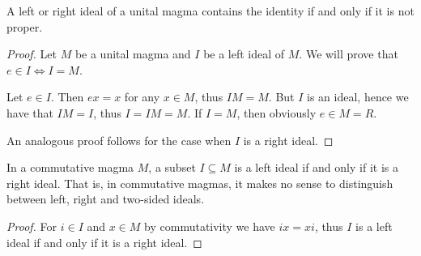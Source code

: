 \begin{proposition}\label{thm:proper_ideals_containing_identity}
  A left or right ideal of a unital magma contains the identity if and only if it is not proper.
\end{proposition}
\begin{proof}
  Let \( M \) be a unital magma and \( I \) be a left ideal of \( M \). We will prove that \( e \in I \iff I = M \).

  \begin{description}
    \Implies Let \( e \in I \). Then \( ex = x \) for any \( x \in M \), thus \( IM = M \). But \( I \) is an ideal, hence we have that \( IM = I \), thus \( I = IM = M \).
    \ImpliedBy If \( I = M \), then obviously \( e \in M = R \).
  \end{description}

  An analogous proof follows for the case when \( I \) is a right ideal.
\end{proof}

\begin{proposition}\label{thm:commutative_magma_ideals}
  In a commutative magma \( M \), a subset \( I \subseteq M \) is a left ideal if and only if it is a right ideal. That is, in commutative magmas, it makes no sense to distinguish between left, right and two-sided ideals.
\end{proposition}
\begin{proof}
  For \( i \in I \) and \( x \in M \) by commutativity we have \( ix = xi \), thus \( I \) is a left ideal if and only if it is a right ideal.
\end{proof}

